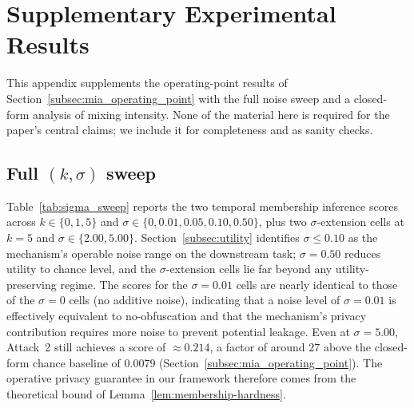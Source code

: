 \documentclass[sigconf,anonymous, review]{acmart}
\begin{document}



\appendix

\section{Supplementary Experimental Results}
\label{app:supplementary}

This appendix supplements the operating-point results of Section~\ref{subsec:mia_operating_point} with the full noise sweep and a closed-form analysis of mixing intensity. None of the material here is required for the paper's central claims; we include it for completeness and as sanity checks.

\subsection{Full $(k, \sigma)$ sweep}
\label{app:sigma_sweep}

Table~\ref{tab:sigma_sweep} reports the two temporal membership inference scores across $k \in \{0, 1, 5\}$ and $\sigma \in \{0, 0.01, 0.05, 0.10, 0.50\}$, plus two $\sigma$-extension cells at $k = 5$ and $\sigma \in \{2.00, 5.00\}$. Section~\ref{subsec:utility} identifies $\sigma \le 0.10$ as the mechanism's operable noise range on the downstream task; $\sigma = 0.50$ reduces utility to chance level, and the $\sigma$-extension cells lie far beyond any utility-preserving regime. The scores for the $\sigma=0.01$ cells are nearly identical to those of the $\sigma=0$ cells (no additive noise), indicating that a noise level of $\sigma=0.01$ is effectively equivalent to no-obfuscation and that the mechanism's privacy contribution requires more noise to prevent potential leakage. Even at $\sigma = 5.00$, Attack~2 still achieves a score of $\approx 0.214$, a factor of around $27$ above the closed-form chance baseline of $0.0079$ (Section~\ref{subsec:mia_operating_point}). The operative privacy guarantee in our framework therefore comes from the theoretical bound of Lemma~\ref{lem:membership-hardness}.
\end{document}
